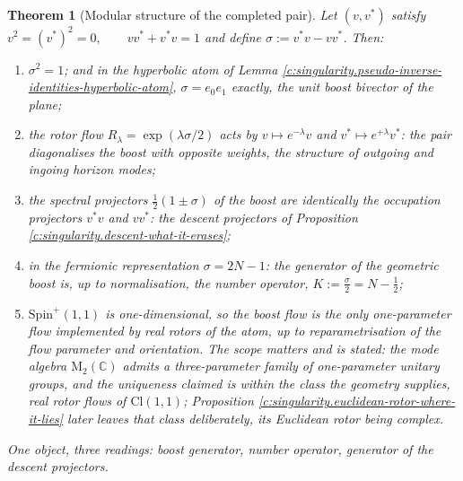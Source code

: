 \documentclass[11pt]{article}
\newtheorem{theorem}{Theorem}[section]
\theoremstyle{definition}
\theoremstyle{plain}
\newcommand{\changedmark}[2]{\marginpar{\raggedright\scriptsize\color{#1}#2}}
\providecommand{\C}{}\renewcommand{\C}{\mathbb{C}}
\providecommand{\Cl}{}\renewcommand{\Cl}{\mathrm{Cl}}
\providecommand{\Mat}{}\renewcommand{\Mat}{\mathrm{M}}
\begin{document}
\begin{theorem}[Modular structure of the completed pair]\label{c:singularity.modular-structure-completed-pair}
\changedmark{BurntOrange}{changed since the deposit}
Let $(v, v^*)$ satisfy $v^2 = (v^*)^2 = 0, \qquad v v^* + v^* v = 1$ and define $\sigma := v^* v - v v^*$. Then:
\begin{enumerate}
\item $\sigma^2 = 1$; and in the hyperbolic atom of Lemma \ref{c:singularity.pseudo-inverse-identities-hyperbolic-atom}, $\sigma = e_0 e_1$ exactly, the unit boost bivector of the plane;
\item the rotor flow $R_\lambda = \exp(\lambda\sigma/2)$ acts by $v \mapsto e^{-\lambda} v$ and $v^* \mapsto e^{+\lambda} v^*$: the pair diagonalises the boost with opposite weights, the structure of outgoing and ingoing horizon modes;
\item the spectral projectors $\tfrac12(1 \pm \sigma)$ of the boost are identically the occupation projectors $v^* v$ and $v v^*$: the descent projectors of Proposition \ref{c:singularity.descent-what-it-erases};
\item in the fermionic representation $\sigma = 2N - 1$: the generator of the geometric boost is, up to normalisation, the number operator, $K := \tfrac{\sigma}{2} = N - \tfrac12$;
\item $\mathrm{Spin}^+(1,1)$ is one-dimensional, so the boost flow is the \emph{only} one-parameter flow implemented by real rotors of the atom, up to reparametrisation of the flow parameter and orientation. The scope matters and is stated: the mode algebra $\Mat_2(\C)$ admits a three-parameter family of one-parameter unitary groups, and the uniqueness claimed is within the class the geometry supplies, real rotor flows of $\Cl(1,1)$; Proposition \ref{c:singularity.euclidean-rotor-where-it-lies} later leaves that class deliberately, its Euclidean rotor being complex.
\end{enumerate}
One object, three readings: boost generator, number operator, generator of the descent projectors.
\end{theorem}
\end{document}

